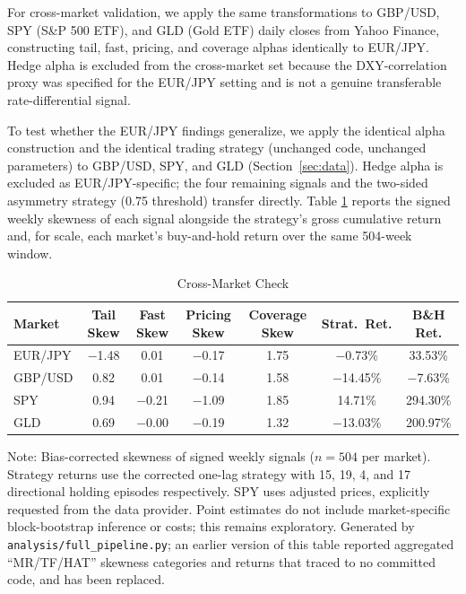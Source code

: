 \documentclass[11pt]{article}
\begin{document}
For cross-market validation, we apply the same transformations to GBP/USD, SPY (S\&P 500 ETF), and GLD (Gold ETF) daily closes from Yahoo Finance, constructing tail, fast, pricing, and coverage alphas identically to EUR/JPY. Hedge alpha is excluded from the cross-market set because the DXY-correlation proxy was specified for the EUR/JPY setting and is not a genuine transferable rate-differential signal.

To test whether the EUR/JPY findings generalize, we apply the identical alpha construction and the identical trading strategy (unchanged code, unchanged parameters) to GBP/USD, SPY, and GLD (Section~\ref{sec:data}). Hedge alpha is excluded as EUR/JPY-specific; the four remaining signals and the two-sided asymmetry strategy (0.75 threshold) transfer directly. Table \ref{tab:crossmarket} reports the signed weekly skewness of each signal alongside the strategy's gross cumulative return and, for scale, each market's buy-and-hold return over the same 504-week window.

\begin{table}[H]
\centering
\caption{Cross-Market Check}
\label{tab:crossmarket}
\small
\begin{tabular}{@{}lcccccc@{}}
\toprule
Market & Tail Skew & Fast Skew & Pricing Skew & Coverage Skew & Strat.\ Ret. & B\&H Ret. \\
\midrule
EUR/JPY & $-$1.48 & 0.01 & $-$0.17 & 1.75 & $-$0.73\% & 33.53\% \\
GBP/USD & 0.82 & 0.01 & $-$0.14 & 1.58 & $-$14.45\% & $-$7.63\% \\
SPY & 0.94 & $-$0.21 & $-$1.09 & 1.85 & 14.71\% & 294.30\% \\
GLD & 0.69 & $-$0.00 & $-$0.19 & 1.32 & $-$13.03\% & 200.97\% \\
\bottomrule
\end{tabular}
\par\vspace{0.3em}
\parbox{\linewidth}{\footnotesize Note: Bias-corrected skewness of signed weekly signals ($n = 504$ per market). Strategy returns use the corrected one-lag strategy with 15, 19, 4, and 17 directional holding episodes respectively. SPY uses adjusted prices, explicitly requested from the data provider. Point estimates do not include market-specific block-bootstrap inference or costs; this remains exploratory. Generated by \texttt{analysis/full\_pipeline.py}; an earlier version of this table reported aggregated ``MR/TF/HAT'' skewness categories and returns that traced to no committed code, and has been replaced.}
\end{table}
\end{document}
